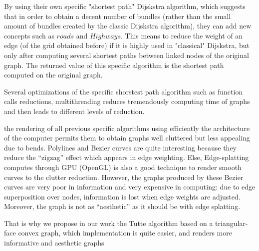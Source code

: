  By using their own specific "shortest path" Dijskstra  algorithm, which suggests that in order to obtain a decent number of bundles (rather than the small amount of bundles created by the classic Dijskstra algorithm), they can add new concepts such as $roads$ and $Highways$. This means to reduce the weight of an edge (of the grid obtained before) if it is highly used in "classical" Dijskstra, but only after computing several shortest paths between linked nodes of the original graph. The returned value of this specific algorithm is the shortest path computed on the original graph.

  Several optimizations of the specific shorstest path algorithm such as function calls reductions, multithreading reduces tremendously computing time of graphs and then leads to different levels of reduction.

the rendering of all previous specific algorithms using efficiently the architecture of the computer permits them to obtain graphs well cluttered but less appealing due to bends. Polylines and Bezier curves are quite interesting because they reduce the “zigzag” effect which appears in edge weighting. Else, Edge-splatting computes through GPU (OpenGL) is also a good technique to render smooth curves to the clutter reduction. However, the graphs produced by these Bezier curves are very poor in information and very expensive in computing: due to edge superposition over nodes, information is lost when edge weights are adjusted. Moreover, the graph is not as “aesthetic” as it should be with edge splatting. 

That is why we propose in our work the Tutte algorithm based on a triangular-face convex graph, which implementation is quite easier, and renders more informative and aesthetic graphs
